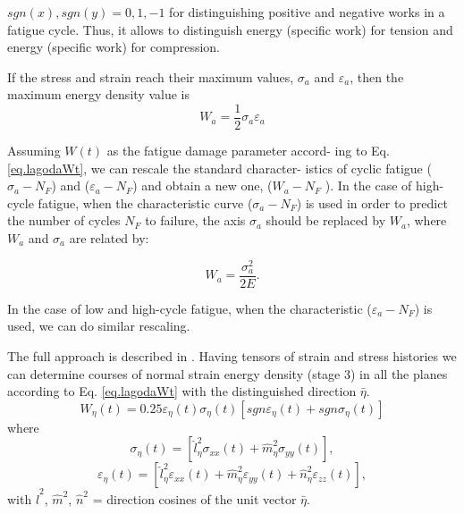 $sgn(x),sgn(y)=0,1,-1$ for distinguishing positive and negative works in a
fatigue cycle. Thus, it allows
to distinguish energy (specific work) for tension and
energy (specific work) for compression. 

If the stress and strain reach their maximum values,
$\sigma_a$ and $\varepsilon_a$, then the maximum energy density value is
\begin{equation}
W_a=\frac{1}{2}\sigma_a\varepsilon_a
\label{eq.lagodaWa}
\end{equation}

Assuming $W(t)$ as the fatigue damage parameter accord-
ing to Eq. \ref{eq.lagodaWt}, we can rescale the standard character-
istics of cyclic fatigue ($\sigma_a-N_F$) and ($\varepsilon_a-N_F$) and obtain a new one, ($W_a-N_F$ ). In the case of high-cycle fatigue, when the characteristic curve ($\sigma_a-N_F$) is used in order to predict the number of cycles $N_F$ to failure, the axis $\sigma_a$ should be replaced by $W_a$, where $W_a$ and $\sigma_a$ are related by:

$$W_a=\frac{\sigma_a^2}{2E}.$$

In the case of low and high-cycle fatigue, when the
characteristic ($\varepsilon_a-N_F$) is used, we can do similar rescaling. 
%
%
%

The full approach is described in . Having tensors of strain and stress histories we can
determine courses of normal strain energy density (stage
3) in all the planes according to Eq. \ref{eq.lagodaWt} with the distinguished direction $\bar{\eta}$.
\begin{equation}
W_{\eta}(t)=0.25\varepsilon_\eta(t)\sigma_\eta(t)[sgn\varepsilon_\eta(t)+sgn\sigma_\eta(t)]
\label{eq.lagodaWeta}
\end{equation}
where
\begin{equation}
\sigma_\eta(t)=[\hat{l}^2_\eta\sigma_{xx}(t)+\hat{m}^2_\eta\sigma_{yy}(t)],
\label{eq.lagodasigeta}
\end{equation}
\begin{equation}\varepsilon_\eta(t)=[\hat{l}^2_\eta\varepsilon_{xx}(t)+\hat{m}^2_\eta\varepsilon_{yy}(t)+\hat{n}^2_\eta\varepsilon_{zz}(t)],\label{eq.lagodavareta}
\end{equation}
with $\hat{l}^2$, $\hat{m}^2$, $\hat{n}^2$ = direction cosines of the unit vector $\bar{\eta}$.

